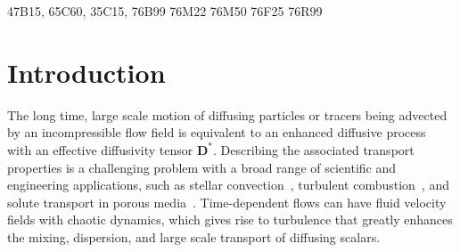 \documentclass[leqno,onefignum,onetabnum]{siamltex1213}
\begin{document}
\begin{AMS}
47B15,
65C60,
35C15,
76B99
76M22
76M50
76F25
76R99   	
\end{AMS}


\pagestyle{myheadings}
\thispagestyle{plain}


\section{Introduction}\label{sec:Introduction}
The long time, large scale motion of diffusing particles or
tracers being advected by an incompressible flow field is equivalent
to an enhanced diffusive process~\cite{Taylor:PRSL:196} with an
effective diffusivity tensor $\mathbf{D}^*$. Describing the associated
transport properties is a challenging problem with a broad range of
scientific and engineering applications, such as stellar
convection~\cite{Knobloch:1992ApJ,Press:1981:ApJ,canut98,canut98b,canut00},
turbulent
combustion~\cite{Aslanyan:BF00790149,Bilger:05:10.1016,Tabaczynski:1990:243},
and solute transport in porous
media~\cite{Bhattacharya:AAP:1999:951,Bhattacharya:1989:ASD,Whitaker:AIC690130308,Gupta:WRCR3940,Koch:1988:965,Lester:PRL:111.174101,Koch:JFM:7961001}.
Time-dependent flows can have fluid velocity fields with chaotic
dynamics, which gives rise to turbulence that greatly enhances the
mixing, dispersion, and large scale transport of diffusing scalars.   
\end{document}
